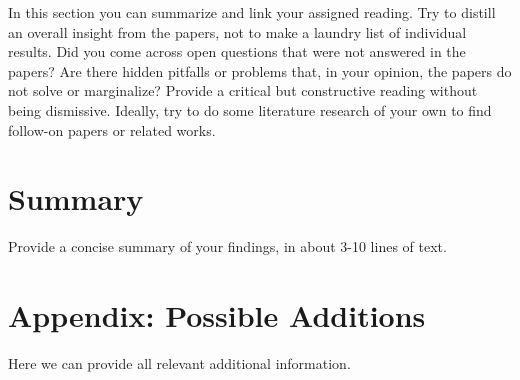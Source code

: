 \documentclass{article}
\begin{document}
In this section you can summarize and link your assigned reading. Try to distill an overall insight from the papers, not to make a laundry list of individual results. Did you come across open questions that were not answered in the papers? Are there hidden pitfalls or problems that, in your opinion, the papers do not solve or marginalize? Provide a critical but constructive reading without being dismissive. Ideally, try to do some literature research of your own to find follow-on papers or related works. 

\section{Summary}

Provide a concise summary of your findings, in about 3-10 lines of text.

\section{Appendix: Possible Additions}
Here we can provide all relevant additional information.

\medskip
\small


\end{document}
